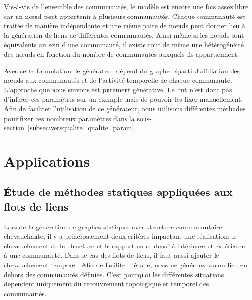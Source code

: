 Vis-à-vis de l'ensemble des communautés, le modèle est encore une fois assez libre car un n\oe{}ud peut appartenir à plusieurs communautés.
Chaque communauté est traitée de manière indépendante et une même paire de n\oe{}uds peut donner lieu à la génération de liens de différentes communautés.
Ainsi même si les n\oe{}uds sont équivalents au sein d'une communauté, il existe tout de même une hétérogénéité des n\oe{}uds en fonction du nombre de communautés auxquels ils appartiennent.

\bigskip

Avec cette formulation, le générateur dépend du graphe biparti d'affiliation des n\oe{}uds aux communautés et de l'activité temporelle de chaque communauté.
L'approche que nous suivons est purement générative.
Le but n'est donc pas d'inférer ces paramètres sur un exemple mais de pouvoir les fixer manuellement.
Afin de faciliter l'utilisation de ce générateur, nous utilisons différentes méthodes pour fixer ces nombreux paramètres dans la sous-section~\ref{subsec:versqualite_qualite_param}.


\section{Applications}
\label{sec:versqualite_Applications}


%



\subsection{Étude de méthodes statiques appliquées aux flots de liens}
\label{sec:versqualite_statique}

Lors de la génération de graphes statiques avec structure communautaire chevauchante, il y a principalement deux critères impactant une réalisation: le chevauchement de la structure et le rapport entre densité intérieure et extérieure à une communauté.
Dans le cas des flots de liens, il faut aussi ajouter le chevauchement temporel.
Afin de faciliter l'étude, nous ne générons aucun lien en dehors des communautés définies.
C'est pourquoi les différentes situations dépendent uniquement du recouvrement topologique et temporel des communautés.
 
